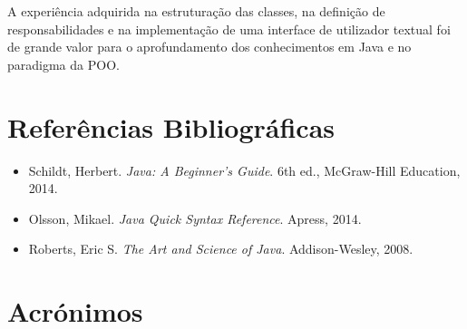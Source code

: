 \documentclass[a4paper,12pt]{article}
\begin{document}
A experiência adquirida na estruturação das classes, na definição de responsabilidades e na implementação de uma interface de utilizador textual foi de grande valor para o aprofundamento dos conhecimentos em Java e no paradigma da POO.

\clearpage

\section{Referências Bibliográficas}
\begin{itemize}
    \item Schildt, Herbert. \textit{Java: A Beginner's Guide}. 6th ed., McGraw-Hill Education, 2014.
    \item Olsson, Mikael. \textit{Java Quick Syntax Reference}. Apress, 2014.
    \item Roberts, Eric S. \textit{The Art and Science of Java}. Addison-Wesley, 2008.
\end{itemize}

\section*{Acrónimos}
\begin{acronym}[UBI]
\end{acronym}
\end{document}
